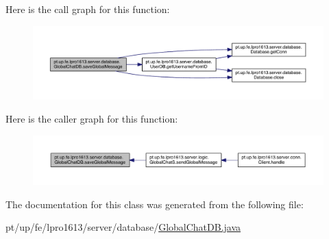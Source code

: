 Here is the call graph for this function\+:
\nopagebreak
\begin{figure}[H]
\begin{center}
\leavevmode
\includegraphics[width=350pt]{classpt_1_1up_1_1fe_1_1lpro1613_1_1server_1_1database_1_1_global_chat_d_b_a15e0bde1ec58cad9c518731db3074105_cgraph}
\end{center}
\end{figure}
Here is the caller graph for this function\+:
\nopagebreak
\begin{figure}[H]
\begin{center}
\leavevmode
\includegraphics[width=350pt]{classpt_1_1up_1_1fe_1_1lpro1613_1_1server_1_1database_1_1_global_chat_d_b_a15e0bde1ec58cad9c518731db3074105_icgraph}
\end{center}
\end{figure}


The documentation for this class was generated from the following file\+:\begin{DoxyCompactItemize}
\item 
pt/up/fe/lpro1613/server/database/\hyperlink{_global_chat_d_b_8java}{Global\+Chat\+D\+B.\+java}\end{DoxyCompactItemize}
